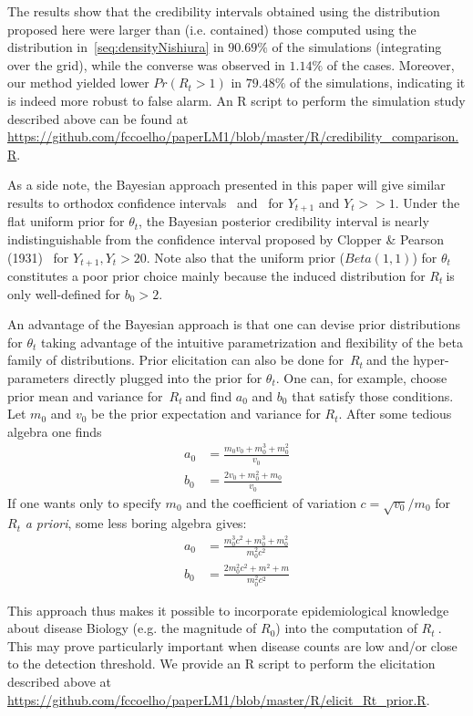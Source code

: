 \documentclass[a4paper,10pt]{article}
\def \rr {$R_{t}\:$}
\begin{document}
The results show that the credibility intervals obtained using the distribution 
proposed here were larger than (i.e. contained) those computed using the 
distribution in~\ref{seq:densityNishiura} in $90.69\%$ of the simulations 
(integrating over the grid), while the converse was observed in $1.14\%$ of the 
cases.
Moreover, our method yielded lower $Pr(R_{t} > 1)$  in $79.48\%$ of the 
simulations, indicating it is indeed more robust to false alarm.
An R script to perform the simulation study described above can be found 
at~\url{
https://github.com/fccoelho/paperLM1/blob/master/R/credibility_comparison.R}.

As a side note, the Bayesian approach presented in this 
paper will give similar results to orthodox confidence intervals~\citep{wilson} 
and~\citep{clopper} for $Y_{t+1}$ and $Y_t >> 1$.
Under the flat  uniform prior for $\theta_t$, the Bayesian posterior 
credibility interval is nearly indistinguishable from the confidence interval 
proposed by Clopper \& Pearson (1931)~\citep{clopper} for $Y_{t+1}, Y_t > 20$.
Note also that the uniform prior ($Beta(1, 1)$) for $\theta_t$ constitutes a 
poor prior choice mainly because the induced distribution for \rr is only 
well-defined for $b_0 > 2$.

An advantage of the Bayesian approach is that one can devise prior 
distributions for $\theta_t$ taking advantage of the intuitive parametrization 
and flexibility of the beta family of distributions.
Prior elicitation can also be done for~\rr and the hyper-parameters directly 
plugged into the prior for $\theta_t$. 
One can, for example, choose prior mean and variance for~\rr and find $a_0$ 
and $b_0$ that satisfy those conditions.
Let $m_0$ and $v_0$ be the prior expectation and variance for $R_t$. 
After some tedious algebra one finds
\begin{align}
\label{seq:elicitation}
a_0 &= \frac{m_0v_0 + m_0^3 + m_0^2}{v_0} \\
b_0 &= \frac{2v_0 + m_0^2 + m_0}{v_0}
\end{align}
If one wants only to specify $m_0$ and the coefficient of variation $c = 
\sqrt{v_0}/ m_0$ for $R_t$ \textit{a priori}, some less boring 
algebra gives:
\begin{align}
\label{seq:elicitationcv}
a_0 &= \frac{m_0^3c^2 + m_0^3 + m_0^2}{m_0^2c^2} \\
b_0 &= \frac{2m_0^2c^2 + m^2 + m}{m_0^2c^2}
\end{align}

This approach thus makes it possible to incorporate epidemiological knowledge 
about disease Biology (e.g. the magnitude of $R_0$) into the computation of \rr.
This may prove particularly important when disease counts are low and/or close 
to the detection threshold.
We provide an R script to perform the elicitation described above at 
\url{https://github.com/fccoelho/paperLM1/blob/master/R/elicit_Rt_prior.R}.
\end{document}
